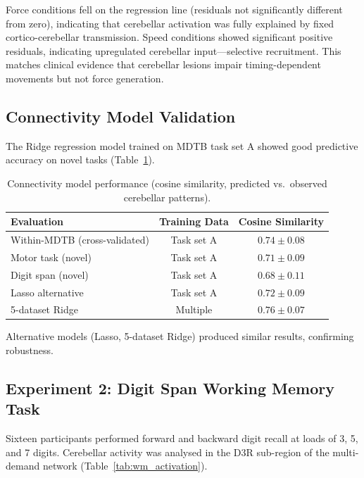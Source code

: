 \documentclass[11pt]{article}
\begin{document}
Force conditions fell on the regression line (residuals not significantly different from zero), indicating that cerebellar activation was fully explained by fixed cortico-cerebellar transmission. Speed conditions showed significant positive residuals, indicating upregulated cerebellar input---selective recruitment. This matches clinical evidence that cerebellar lesions impair timing-dependent movements but not force generation.

\subsection{Connectivity Model Validation}

The Ridge regression model trained on MDTB task set A showed good predictive accuracy on novel tasks (Table~\ref{tab:model}).

\begin{table}[H]
\centering
\caption{Connectivity model performance (cosine similarity, predicted vs.\ observed cerebellar patterns).}
\label{tab:model}
\begin{tabular}{@{}lcc@{}}
\toprule
Evaluation & Training Data & Cosine Similarity \\
\midrule
Within-MDTB (cross-validated) & Task set A & $0.74 \pm 0.08$ \\
Motor task (novel) & Task set A & $0.71 \pm 0.09$ \\
Digit span (novel) & Task set A & $0.68 \pm 0.11$ \\
Lasso alternative & Task set A & $0.72 \pm 0.09$ \\
5-dataset Ridge & Multiple & $0.76 \pm 0.07$ \\
\bottomrule
\end{tabular}
\end{table}

Alternative models (Lasso, 5-dataset Ridge) produced similar results, confirming robustness.

\subsection{Experiment 2: Digit Span Working Memory Task}

Sixteen participants performed forward and backward digit recall at loads of 3, 5, and 7 digits. Cerebellar activity was analysed in the D3R sub-region of the multi-demand network \citep{duncan2010multiple, fedorenko2013broad} (Table~\ref{tab:wm_activation}).
\end{document}
